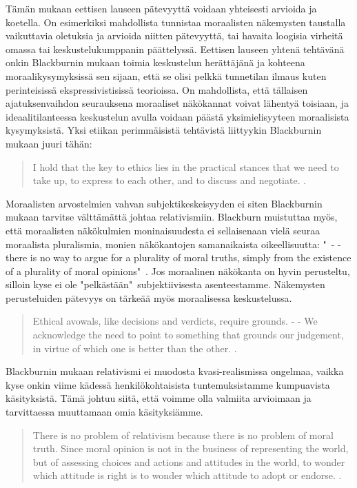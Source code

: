 \documentclass[a4paper,12pt,times,titlepage,finnish]{article}
\begin{document}
Tä\-män mukaan eettisen lauseen pätevyyttä voidaan yhteisesti arvioida ja koetella. On esimerkiksi mahdollista tunnistaa moraalisten näkemysten taustalla vaikuttavia oletuksia ja arvioida niitten pätevyyttä, tai havaita loogisia virheitä omassa tai keskustelukumppanin päät\-te\-lys\-sä. Eettisen lauseen yhtenä tehtävänä onkin Blackburnin mukaan toimia keskustelun herättäjänä ja kohteena moraalikysymyksissä sen sijaan, että se olisi pelkkä tunnetilan ilmaus kuten perinteisissä ekspressivistisissä teorioissa. On mahdollista, että tällaisen ajatuk\-sen\-vaih\-don seurauksena moraaliset näkökannat voivat lähentyä toisiaan, ja ideaalitilanteessa keskustelun avulla voidaan päästä yksimielisyyteen moraalisista kysymyksistä. Yksi etiikan perimmäisistä tehtävistä liittyykin Blackburnin mukaan juuri tähän: 

\begin{quote}
I hold that the key to ethics lies in the practical stances that we need to take up, to express to each other, and to discuss and negotiate. \citep[213]{Blackburn99}. 
\end{quote}

Moraalisten arvostelmien vahvan subjektikeskeisyyden ei siten Blackburnin mukaan tarvitse välttämättä johtaa relativismiin. Blackburn muistuttaa myös, että moraalisten näkökulmien moninaisuudesta ei sellaisenaan vielä seuraa moraalista pluralismia, monien näkökantojen samanaikaista oikeellisuutta: "\ - - there is no way to argue for a plurality of moral truths, simply from the existence of a plurality of moral opinions"\ \citep[213]{Blackburn99}. Jos moraalinen näkökanta on hyvin perusteltu, silloin kyse ei ole "pelkästään"\ subjektiivisesta asenteestamme. Näkemysten perusteluiden pätevyys on tärkeää myös moraalisessa keskustelussa. 

\begin{quote}
 Ethical avowals, like decisions and verdicts, require grounds. - - We acknowledge the need to point to something that grounds our judgement, in virtue of which one is better than the other. \citep[69]{Blackburn98}. 
\end{quote}

Blackburnin mukaan relativismi ei muodosta kvasi-\-realismissa ongelmaa, vaikka kyse onkin viime kädessä henkilökohtaisista tuntemuksistamme kumpuavista kä\-si\-tyk\-sis\-tä.  Tä\-mä johtuu siitä, että voimme olla valmiita arvioimaan ja tarvittaessa muuttamaan omia käsityksiämme.

\begin{quote}
	There is no problem of relativism because there is no problem of moral truth. Since moral opinion is not in the business of representing the world, but of assessing choices and actions and attitudes in the world, to wonder which attitude is right is to wonder which attitude to adopt or endorse. \citep[214]{Blackburn99}.
\end{quote}
\end{document}
